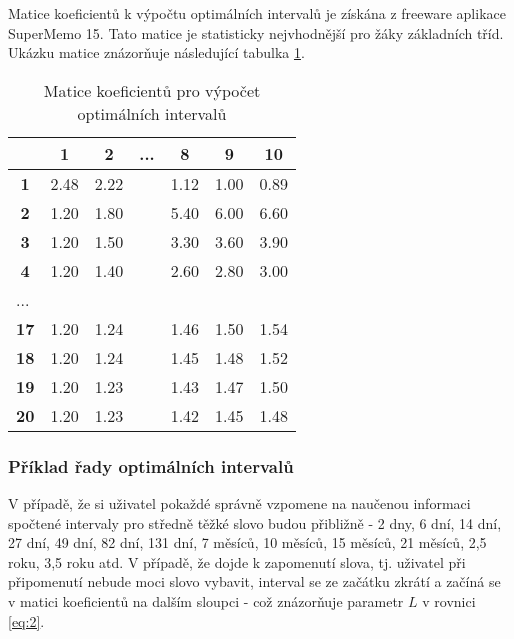 \documentclass[a4paper,11pt,titlepage,fleqn]{article}
\begin{document}
            Matice koeficientů k výpočtu optimálních intervalů je získána z freeware aplikace SuperMemo 15. Tato matice je statisticky nejvhodnější pro žáky základních tříd. Ukázku matice znázorňuje následující tabulka \ref{of-matrix}.

            \begin{table}[ht!]
                \centering
                \begin{tabular}{|c|c|c|l|c|c|c|}
                    \hline
                     & \textbf{1} & \textbf{2} & ... & \textbf{8} & \textbf{9} & \textbf{10} \\ \hline
                    \textbf{1} & 2.48 & 2.22 &  & 1.12 & 1.00 & 0.89 \\ \hline
                    \textbf{2} & 1.20 & 1.80 &  & 5.40 & 6.00 & 6.60 \\ \hline
                    \textbf{3} & 1.20 & 1.50 &  & 3.30 & 3.60 & 3.90 \\ \hline
                    \textbf{4} & 1.20 & 1.40 &  & 2.60 & 2.80 & 3.00 \\ \hline
                    \multicolumn{1}{|l|}{...} & \multicolumn{1}{l|}{} & \multicolumn{1}{l|}{} &  & \multicolumn{1}{l|}{} & \multicolumn{1}{l|}{} & \multicolumn{1}{l|}{} \\ \hline
                    \textbf{17} & 1.20 & 1.24 &  & 1.46 & 1.50 & 1.54 \\ \hline
                    \textbf{18} & 1.20 & 1.24 &  & 1.45 & 1.48 & 1.52 \\ \hline
                    \textbf{19} & 1.20 & 1.23 &  & 1.43 & 1.47 & 1.50 \\ \hline
                    \textbf{20} & 1.20 & 1.23 &  & 1.42 & 1.45 & 1.48 \\ \hline
                \end{tabular}
                \caption{Matice koeficientů pro výpočet optimálních intervalů}
                \label{of-matrix}
            \end{table}

        \subsubsection{Příklad řady optimálních intervalů}
            V případě, že si uživatel pokaždé správně vzpomene na naučenou informaci spočtené intervaly pro středně těžké slovo budou přibližně - 2 dny, 6 dní, 14 dní, 27 dní, 49 dní, 82 dní, 131 dní, 7 měsíců, 10 měsíců, 15 měsíců, 21 měsíců, 2,5 roku, 3,5 roku atd. V případě, že dojde k zapomenutí slova, tj. uživatel při připomenutí nebude moci slovo vybavit, interval se ze začátku zkrátí a začíná se v matici koeficientů na dalším sloupci - což znázorňuje parametr $L$ v rovnici \ref{eq:2}.
\end{document}
